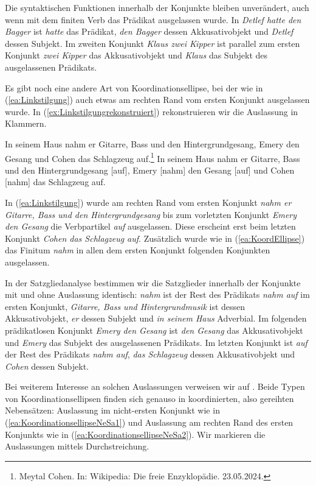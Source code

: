 Die syntaktischen Funktionen innerhalb der Konjunkte bleiben unverändert, auch wenn mit dem finiten Verb das Prädikat ausgelassen wurde. In \textit{Detlef hatte den Bagger} ist \textit{hatte} das Prädikat, \textit{den Bagger} dessen Akkusativobjekt und \textit{Detlef} dessen Subjekt. Im zweiten Konjunkt \textit{Klaus zwei Kipper} ist parallel zum ersten Konjunkt \textit{zwei Kipper} das Akkusativobjekt und \textit{Klaus} das Subjekt des ausgelassenen Prädikats. 

Es gibt noch eine andere Art von Koordinationsellipse, bei der wie in (\ref{ea:Linkstilgung}) auch etwas am rechten Rand vom ersten Konjunkt ausgelassen wurde. In (\ref{ex:Linkstilgungrekonstruiert}) rekonstruieren wir die Auslassung in Klammern.

\ea 
\ea \label{ea:Linkstilgung} In seinem Haus nahm er Gitarre, Bass und den Hintergrundgesang, Emery den Gesang und Cohen das Schlagzeug auf.\footnote{Meytal Cohen. In: Wikipedia: Die freie Enzyklopädie. 23.05.2024.}
\ex \label{ex:Linkstilgungrekonstruiert} In seinem Haus nahm er Gitarre, Bass und den Hintergrundgesang [auf], Emery [nahm] den Gesang [auf] und Cohen [nahm] das Schlagzeug auf.  
\z 
\z 

In (\ref{ea:Linkstilgung}) wurde am rechten Rand vom ersten Konjunkt \textit{nahm er Gitarre, Bass und den Hintergrundgesang} bis zum vorletzten Konjunkt \textit{Emery den Gesang} die Verbpartikel \textit{auf} ausgelassen. Diese erscheint erst beim letzten Konjunkt \textit{Cohen das Schlagzeug auf}. Zusätzlich wurde wie in (\ref{ea:KoordEllipse}) das Finitum \textit{nahm} in allen dem ersten Konjunkt folgenden Konjunkten ausgelassen. 


In der Satzgliedanalyse bestimmen wir die Satzglieder innerhalb der Konjunkte mit und ohne Auslassung identisch: \textit{nahm} ist der Rest des Prädikats \textit{nahm auf} im ersten Konjunkt, \textit{Gitarre, Bass und Hintergrundmusik} ist dessen Akkusativobjekt, \textit{er} dessen Subjekt und \textit{in seinem Haus} Adverbial. Im folgenden prädikatlosen Konjunkt \textit{Emery den Gesang} ist \textit{den Gesang} das Akkusativobjekt und \textit{Emery} das Subjekt des ausgelassenen Prädikats. Im letzten Konjunkt ist \textit{auf} der Rest des Prädikats \textit{nahm auf}, \textit{das Schlagzeug} dessen Akkusativobjekt und \textit{Cohen} dessen Subjekt.  

\largerpage[-1]
Bei weiterem Interesse an solchen Auslassungen verweisen wir auf \citet[93--96]{Pafel2011}. Beide Typen von Koordinationsellipsen finden sich genauso in koordinierten, also gereihten Nebensätzen: Auslassung im nicht-ersten Konjunkt wie in (\ref{ea:KoordinationsellipseNeSa1}) und Auslassung am rechten Rand des ersten Konjunkts wie in (\ref{ea:KoordinationsellipseNeSa2}). Wir markieren die Auslassungen mittels Durchstreichung. 


